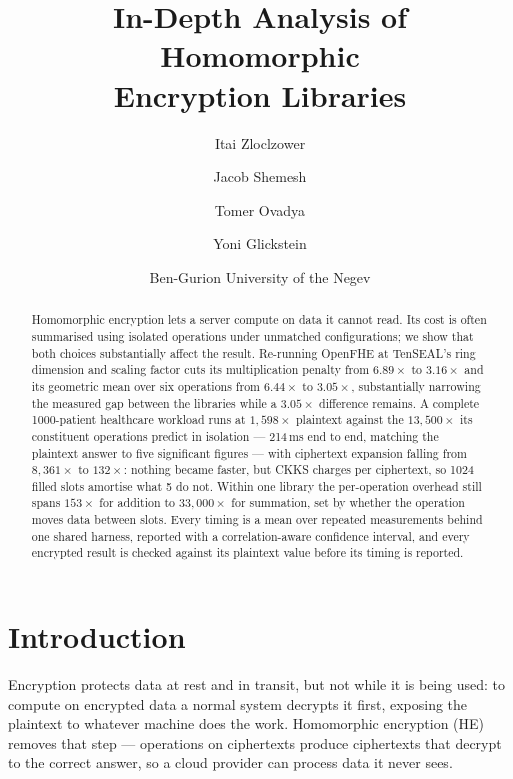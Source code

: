 \documentclass[11pt,a4paper]{article}
\title{\vspace{-1.0cm}\textbf{In-Depth Analysis of Homomorphic\\Encryption Libraries}}
\author{Itai Zloclzower \and Jacob Shemesh \and Tomer Ovadya \and Yoni Glickstein}
\date{Ben-Gurion University of the Negev}
\begin{document}
\maketitle
\vspace{-0.5cm}

\begin{abstract}
\noindent
Homomorphic encryption lets a server compute on data it cannot read. Its cost is
often summarised using isolated operations under unmatched configurations; we show
that both choices substantially affect the result. Re-running OpenFHE at TenSEAL's
ring dimension and scaling factor cuts its multiplication penalty from $6.89\times$
to $3.16\times$ and its geometric mean over six operations from $6.44\times$ to
$3.05\times$, substantially narrowing the measured gap between the libraries while a
$3.05\times$ difference remains. A complete
1000-patient healthcare workload runs at $1{,}598\times$ plaintext against the
$13{,}500\times$ its constituent operations predict in isolation --- 214\,ms end to
end, matching the plaintext answer to five significant figures --- with ciphertext
expansion falling from $8{,}361\times$ to $132\times$: nothing became faster, but
CKKS charges per ciphertext, so 1024 filled slots amortise what 5 do not. Within one
library the per-operation overhead still spans $153\times$ for addition to
$33{,}000\times$ for summation, set by whether the operation moves data between
slots. Every timing is a mean over repeated measurements behind one shared harness,
reported with a correlation-aware confidence interval, and every encrypted result is
checked against its plaintext value before its timing is reported.
\end{abstract}

\vspace{0.2cm}

\section{Introduction}

Encryption protects data at rest and in transit, but not while it is being used: to
compute on encrypted data a normal system decrypts it first, exposing the plaintext
to whatever machine does the work. Homomorphic encryption (HE) removes that step ---
operations on ciphertexts produce ciphertexts that decrypt to the correct answer, so
a cloud provider can process data it never sees.
\end{document}
